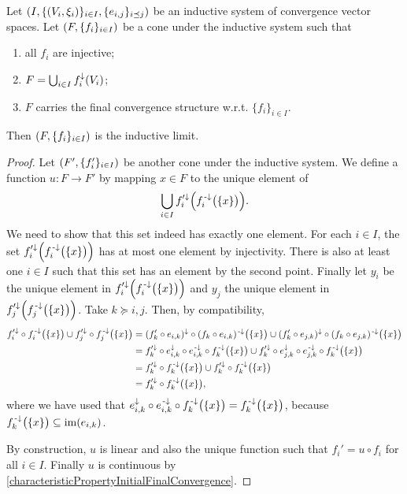 \begin{proposition}
Let $\sSet{I, \{\sSet{V_i, \xi_i}\}_{i\in I}, \{e_{i,j}\}_{i\preceq j}}$ be an inductive system of convergence vector spaces. Let $\sSet{F, \{f_i\}_{i\in I}}$ be a cone under the inductive system such that
\begin{enumerate}
\item all $f_i$ are injective;
\item $F = \bigcup_{i\in I}f_i^\downarrow(V_i)$;
\item $F$ carries the final convergence structure w.r.t. $\{f_i\}_{i\in I}$.
\end{enumerate}
Then $\sSet{F, \{f_i\}_{i\in I}}$ is the inductive limit.
\end{proposition}
\begin{proof}
Let $\sSet{F', \{f_i'\}_{i\in I}}$ be another cone under the inductive system. We define a function $u: F \to F'$ by mapping $x\in F$ to the unique element of
\[ \bigcup_{i\in I}f_i^{\prime\downarrow}\Big(f_i^{{\text{\hspace{0.15em}-}\downarrow}}\big(\{x\}\big)\Big). \]
We need to show that this set indeed has exactly one element. For each $i\in I$, the set $f_i^{\prime\downarrow}\Big(f_i^{{\text{\hspace{0.15em}-}\downarrow}}\big(\{x\}\big)\Big)$ has at most one element by injectivity. There is also at least one $i\in I$ such that this set has an element by the second point. Finally let $y_i$ be the unique element in $f_i^{\prime\downarrow}\Big(f_i^{{\text{\hspace{0.15em}-}\downarrow}}\big(\{x\}\big)\Big)$ and $y_j$ the unique element in $f_j^{\prime\downarrow}\Big(f_j^{{\text{\hspace{0.15em}-}\downarrow}}\big(\{x\}\big)\Big)$. Take $k\succeq i,j$. Then, by compatibility, 
\begin{align*}
f_i^{\prime\downarrow}\circ f_i^{{\text{\hspace{0.15em}-}\downarrow}}\big(\{x\}\big) \cup f_j^{\prime\downarrow}\circ f_j^{{\text{\hspace{0.15em}-}\downarrow}}\big(\{x\}\big) &= (f_k'\circ e_{i,k})^{\downarrow}\circ (f_k\circ e_{i,k})^{{\text{\hspace{0.15em}-}\downarrow}}\big(\{x\}\big) \cup (f_k'\circ e_{j,k})^{\downarrow}\circ (f_k\circ e_{j,k})^{{\text{\hspace{0.15em}-}\downarrow}}\big(\{x\}\big) \\
&= f_k^{\prime\downarrow}\circ e_{i,k}^{\downarrow}\circ e_{i,k}^{{\text{\hspace{0.15em}-}\downarrow}} \circ f_k^{\text{\hspace{0.15em}-}\downarrow} \big(\{x\}\big) \cup f_k^{\prime\downarrow}\circ e_{j,k}^{\downarrow}\circ e_{j,k}^{{\text{\hspace{0.15em}-}\downarrow}} \circ f_k^{\text{\hspace{0.15em}-}\downarrow} \big(\{x\}\big) \\
&= f_k^{\prime\downarrow} \circ f_k^{\text{\hspace{0.15em}-}\downarrow} \big(\{x\}\big) \cup f_k^{\prime\downarrow}\circ f_k^{\text{\hspace{0.15em}-}\downarrow} \big(\{x\}\big) \\
&= f_k^{\prime\downarrow} \circ f_k^{\text{\hspace{0.15em}-}\downarrow} \big(\{x\}\big),
\end{align*}
where we have used that $e_{i,k}^{\downarrow}\circ e_{i,k}^{{\text{\hspace{0.15em}-}\downarrow}} \circ f_k^{\text{\hspace{0.15em}-}\downarrow} \big(\{x\}\big) = f_k^{\text{\hspace{0.15em}-}\downarrow} \big(\{x\}\big)$, because $f_k^{\text{\hspace{0.15em}-}\downarrow} \big(\{x\}\big) \subseteq \operatorname{im}(e_{i,k})$.

By construction, $u$ is linear and also the unique function such that $f_i' = u\circ f_i$ for all $i\in I$. Finally $u$ is continuous by \ref{characteristicPropertyInitialFinalConvergence}.
\end{proof}

